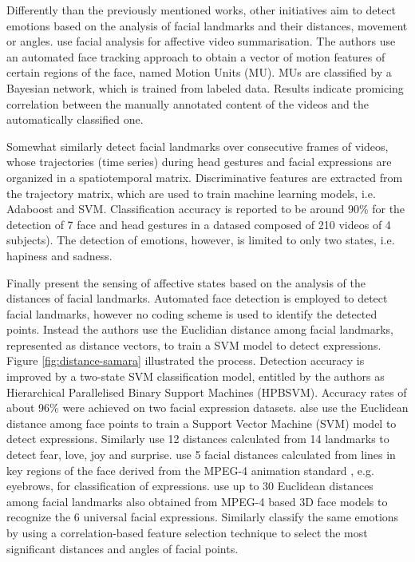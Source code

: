 Differently than the previously mentioned works, other initiatives aim to detect emotions based on the analysis of facial landmarks and their distances, movement or angles. \textcite{joho2009exploiting} use facial analysis for affective video summarisation. The authors use an automated face tracking approach to obtain a vector of motion features of certain regions of the face, named Motion Units (MU). MUs are classified by a Bayesian network, which is trained from labeled data. Results indicate promicing correlation between the manually annotated content of the videos and the automatically classified one.

Somewhat similarly \textcite{akakin2010spatiotemporal} detect facial landmarks over consecutive frames of videos, whose trajectories (time series) during head gestures and facial expressions are organized in a spatiotemporal matrix. Discriminative features are extracted from the trajectory matrix, which are used to train machine learning models, i.e. Adaboost and SVM. Classification accuracy is reported to be around 90\% for the detection of 7 face and head gestures in a datased composed of 210 videos of 4 subjects). The detection of emotions, however, is limited to only two states, i.e. hapiness and sadness.

Finally \textcite{samara2016sensing} present the sensing of affective states based on the analysis of the distances of facial landmarks. Automated face detection is employed to detect facial landmarks, however no coding scheme is used to identify the detected points. Instead the authors use the Euclidian distance among facial landmarks, represented as distance vectors, to train a SVM model to detect expressions. Figure \ref{fig:distance-samara} illustrated the process. Detection accuracy is improved by a two-state SVM classification model, entitled by the authors as Hierarchical Parallelised Binary Support Machines (HPBSVM). Accuracy rates of about 96\% were achieved on two facial expression datasets. \textcite{samara2016sensing} alse use the Euclidean distance among face points to train a Support Vector Machine (SVM) model to detect expressions. Similarly \textcite{chang2009emotion} use 12 distances calculated from 14 landmarks to detect fear, love, joy and surprise. \textcite{hammal2007facial} use 5 facial distances calculated from lines in key regions of the face derived from the MPEG-4 animation standard \parencite{abrantes1999mpeg}, e.g. eyebrows, for classification of expressions. \textcite{tang20083d,tang2008line} use up to 30 Euclidean distances among facial landmarks also obtained from MPEG-4 based 3D face models to recognize the 6 universal facial expressions. Similarly \textcite{hupont2013facial} classify the same emotions by using a correlation-based feature selection technique to select the most significant distances and angles of facial points.

